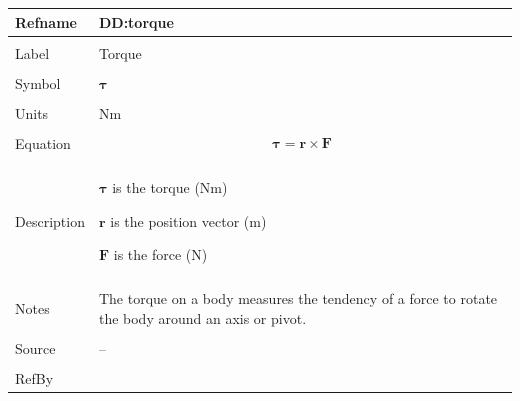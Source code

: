 \documentclass[12pt]{article}
\begin{document}
\vspace{\baselineskip}
\noindent
\begin{minipage}{\textwidth}
\begin{tabular}{>{\raggedright}p{}>{\raggedright\arraybackslash}p{}}
\toprule \textbf{Refname} & \textbf{DD:torque}
\label{DD:torque}
\\ \midrule \\
Label & Torque
        
\\ \midrule \\
Symbol & $\mathbf{τ}$
         
\\ \midrule \\
Units & $\text{N}\text{m}$
        
\\ \midrule \\
Equation & \begin{displaymath}
           \mathbf{τ}=\mathbf{r}\times\mathbf{F}
           \end{displaymath}
\\ \midrule \\
Description & \begin{symbDescription}
              \item{$\mathbf{τ}$ is the torque ($\text{N}\text{m}$)}
              \item{$\mathbf{r}$ is the position vector (${\text{m}}$)}
              \item{$\mathbf{F}$ is the force (${\text{N}}$)}
              \end{symbDescription}
\\ \midrule \\
Notes & The torque on a body measures the tendency of a force to rotate the body around an axis or pivot.
        
\\ \midrule \\
Source & --
         
\\ \midrule \\
RefBy & 
\\ \bottomrule
\end{tabular}
\end{minipage}
\end{document}

